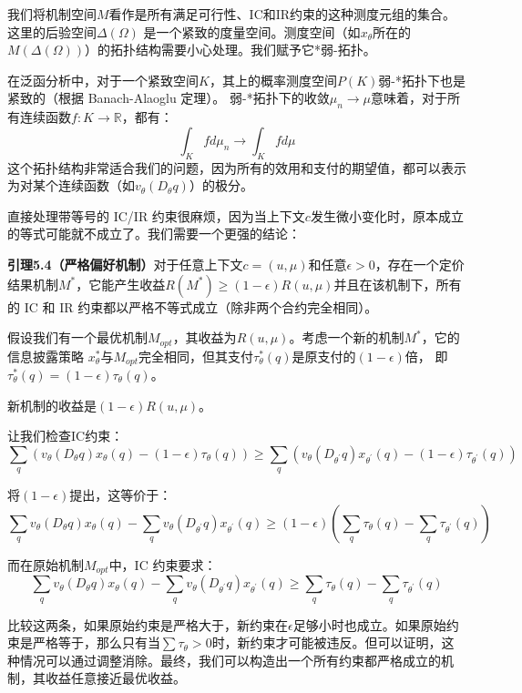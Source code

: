我们将机制空间$M$看作是所有满足可行性、IC和IR约束的这种测度元组的集合。这里的后验空间$\Delta(\Omega)$
是一个紧致的度量空间。测度空间（如$x_\theta$所在的$M(\Delta(\Omega))$）的拓扑结构需要小心处理。我们赋予它*弱-拓扑。

在泛函分析中，对于一个紧致空间$K$，其上的概率测度空间$P(K)$弱-*拓扑下也是紧致的（根据 Banach-Alaoglu 定理）。
弱-*拓扑下的收敛$\mu_n\to\mu$意味着，对于所有连续函数$f:K\to\mathbb{R}$，都有： 
$$\int_K f d \mu_n\to \int_K f d\mu$$
这个拓扑结构非常适合我们的问题，因为所有的效用和支付的期望值，都可以表示为对某个连续函数（如$v_\theta(D_\theta q)$）的极分。

直接处理带等号的 IC/IR 约束很麻烦，因为当上下文$c$发生微小变化时，原本成立的等式可能就不成立了。我们需要一个更强的结论：

\textbf{引理5.4（严格偏好机制）}对于任意上下文$c=(u,\mu)$和任意$\epsilon >0$，存在一个定价
结果机制$M^\ast$，它能产生收益$R(M^\ast)\geq (1-\epsilon)R(u,\mu)$并且在该机制下，所有的 IC 和 IR 约束都以严格不等式成立（除非两个合约完全相同）。

假设我们有一个最优机制$M_{opt}$，其收益为$R(u,\mu)$。考虑一个新的机制$M^\ast$，它的信息披露策略
$x^\ast_{\theta}$与$M_{opt}$完全相同，但其支付$\tau_{\theta}^\ast (q)$是原支付的$(1-\epsilon)$倍，
即$\tau^\ast_{\theta}(q) = (1 - \epsilon)\tau_{\theta}(q)$。

新机制的收益是$(1-\epsilon)R(u,\mu)$。

让我们检查IC约束：
$$\sum\limits_{q}(v_\theta(D_{\theta}q)x_\theta (q) - (1 - \epsilon)\tau_\theta (q))\geq \sum\limits_{q}\left(v_\theta (D_{\theta^\prime}q)x_{\theta^\prime}(q) - (1 - \epsilon)\tau_{\theta^\prime}(q)\right)$$

将$(1-\epsilon)$提出，这等价于：
$$\sum\limits_{q}v_\theta (D_{\theta}q)x_{\theta}(q)-\sum\limits_{q}v_{\theta}(D_{\theta^\prime}q)x_{\theta^\prime}(q)\geq (1 - \epsilon)\left(\sum\limits_{q}\tau_{\theta}(q) - \sum\limits_{q}\tau_{\theta^\prime}(q)\right)$$

而在原始机制$M_{opt}$中，IC 约束要求：
$$\sum\limits_{q} v_{\theta}(D_{\theta}q)x_{\theta}(q)-\sum\limits_{q}v_{\theta}(D_{\theta^\prime}q)x_{\theta^\prime}(q)\geq \sum\limits_{q}\tau_{\theta}(q)-\sum\limits_{q}\tau_{\theta^\prime}(q)$$

比较这两条，如果原始约束是严格大于，新约束在$\epsilon$足够小时也成立。如果原始约束是严格等于，那么只有当$\sum \tau_{\theta}>0$时，新约束才可能被违反。但可以证明，这种情况可以通过调整消除。最终，我们可以构造出一个所有约束都严格成立的机制，其收益任意接近最优收益。

